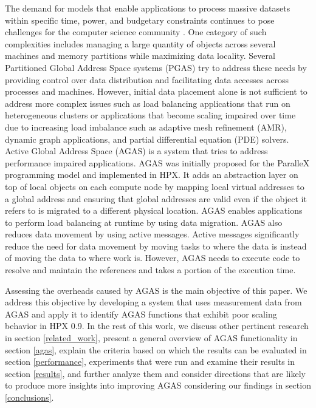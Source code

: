 The demand for models that enable applications to process massive
datasets within specific time, power, and budgetary constraints continues to
pose challenges for the computer science community
\cite{Amarasinghe091exascale,Sterling2009}. One category of such complexities
includes managing a large quantity of objects across several machines and
memory partitions while maximizing data locality. Several Partitioned Global
Address Space systems (PGAS) \cite{pgasorg} try to address these needs by
providing control over data distribution and facilitating data accesses across
processes and machines. However, initial data placement alone is not sufficient
to address more complex issues such as load balancing applications that run on heterogeneous clusters or applications
that become scaling impaired over time due to increasing load imbalance such
as adaptive mesh refinement (AMR), dynamic graph applications, and partial
differential equation (PDE) solvers\cite{5364511,Anderson2011a,Dekate2011}.
Active Global Address Space (AGAS) is a system that tries to address
performance impaired applications. AGAS was initially proposed for the ParalleX
programming model\cite{5364511} and implemented in HPX. It adds an abstraction
layer on top of local objects on each compute node by mapping local virtual
addresses to a global address and ensuring that global addresses are valid even
if the object it refers to is migrated to a different physical location. AGAS
enables applications to perform load balancing at runtime by using data
migration.  AGAS also reduces data movement by using active messages. Active
messages significantly reduce the need for data movement by moving tasks to
where the data is instead of moving the data to where work is. 
However, AGAS needs to execute code to resolve and maintain the references and
takes a portion of the execution time. 


Assessing the overheads caused by AGAS is the main objective of this paper. We
address this objective by developing a system that uses measurement data from
AGAS and apply it to identify AGAS functions that exhibit poor scaling
behavior in HPX 0.9. In the rest of this work, we discuss other pertinent
research in section \ref{related_work}, present a general overview of AGAS
functionality in section \ref{agas}, explain the criteria based on which the
results can be evaluated in section \ref{performance}, experiments that were
run and examine their results in section \ref{results}, and further analyze
them and consider directions that are likely to produce more insights into
improving AGAS considering our findings in section \ref{conclusions}.
